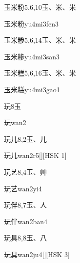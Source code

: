 \begin{entry}{玉米粉}{5,6,10}{⽟、⽶、⽶}
  \begin{phonetics}{玉米粉}{yu4mi3fen3}
  \end{phonetics}
\end{entry}

\begin{entry}{玉米糁}{5,6,14}{⽟、⽶、⽶}
  \begin{phonetics}{玉米糁}{yu4mi3san3}
  \end{phonetics}
\end{entry}

\begin{entry}{玉米糕}{5,6,16}{⽟、⽶、⽶}
  \begin{phonetics}{玉米糕}{yu4mi3gao1}
  \end{phonetics}
\end{entry}

\begin{entry}{玩}{8}{⽟}
  \begin{phonetics}{玩}{wan2}
  \end{phonetics}
\end{entry}

\begin{entry}{玩儿}{8,2}{⽟、⼉}
  \begin{phonetics}{玩儿}{wan2r5}[][HSK 1]
  \end{phonetics}
\end{entry}

\begin{entry}{玩艺}{8,4}{⽟、⾋}
  \begin{phonetics}{玩艺}{wan2yi4}
  \end{phonetics}
\end{entry}

\begin{entry}{玩伴}{8,7}{⽟、⼈}
  \begin{phonetics}{玩伴}{wan2ban4}
  \end{phonetics}
\end{entry}

\begin{entry}{玩具}{8,8}{⽟、⼋}
  \begin{phonetics}{玩具}{wan2ju4}[][HSK 3]
  \end{phonetics}
\end{entry}

